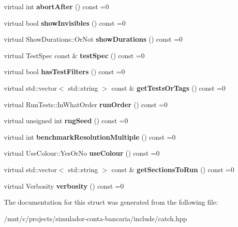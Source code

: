 \begin{DoxyCompactItemize}
virtual int {\bfseries abort\+After} () const =0
\item 
\mbox{\label{structCatch_1_1IConfig_aa288bf92ccd0aafd85409d8aefdf738c}} 
virtual bool {\bfseries show\+Invisibles} () const =0
\item 
\mbox{\label{structCatch_1_1IConfig_abaa97d281484278291f0d3db6d404aeb}} 
virtual Show\+Durations\+::\+Or\+Not {\bfseries show\+Durations} () const =0
\item 
\mbox{\label{structCatch_1_1IConfig_a03a2fd8221d896d12bf3684ab2a03588}} 
virtual Test\+Spec const  \& {\bfseries test\+Spec} () const =0
\item 
\mbox{\label{structCatch_1_1IConfig_a49a475bbeb3180c06799d6d958914649}} 
virtual bool {\bfseries has\+Test\+Filters} () const =0
\item 
\mbox{\label{structCatch_1_1IConfig_a1b8a299344a493eb98c12faae48421d7}} 
virtual std\+::vector$<$ std\+::string $>$ const  \& {\bfseries get\+Tests\+Or\+Tags} () const =0
\item 
\mbox{\label{structCatch_1_1IConfig_a0fc59c9aba1d4018538d5526daa5eb78}} 
virtual Run\+Tests\+::\+In\+What\+Order {\bfseries run\+Order} () const =0
\item 
\mbox{\label{structCatch_1_1IConfig_ae049eb45979d841073fa65d1094c7f14}} 
virtual unsigned int {\bfseries rng\+Seed} () const =0
\item 
\mbox{\label{structCatch_1_1IConfig_a775f740b8af9df931e87db51dfdc6033}} 
virtual int {\bfseries benchmark\+Resolution\+Multiple} () const =0
\item 
\mbox{\label{structCatch_1_1IConfig_a87ec19a6b486eb5b5015cf7738fee026}} 
virtual Use\+Colour\+::\+Yes\+Or\+No {\bfseries use\+Colour} () const =0
\item 
\mbox{\label{structCatch_1_1IConfig_afc801995e115557f90e41f3d6e96908d}} 
virtual std\+::vector$<$ std\+::string $>$ const  \& {\bfseries get\+Sections\+To\+Run} () const =0
\item 
\mbox{\label{structCatch_1_1IConfig_a55aff5924bdbb3f558775821b1eb4b3d}} 
virtual Verbosity {\bfseries verbosity} () const =0
\end{DoxyCompactItemize}


The documentation for this struct was generated from the following file\+:\begin{DoxyCompactItemize}
\item 
/mnt/c/projects/simulador-\/conta-\/bancaria/include/catch.\+hpp\end{DoxyCompactItemize}
